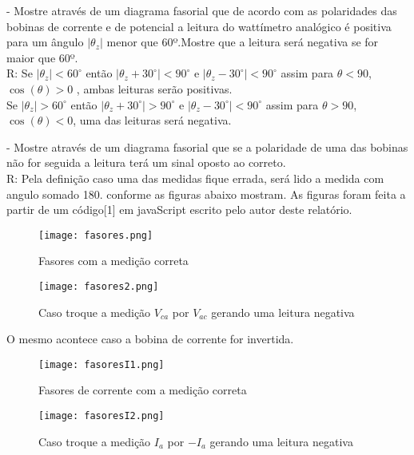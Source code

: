 \documentclass[a4paper, 12pt]{article}
\begin{document}
- Mostre através de um diagrama fasorial que de acordo com as polaridades das bobinas
de corrente e de potencial a leitura do wattímetro analógico é positiva para um ângulo $\left| \theta_z \right|$ menor que 60º.Mostre que a leitura será negativa se  for maior que 60º.\\
R: Se $\left|\theta_z\right| < 60^\circ$ então $\left |\theta_z + 30^\circ\right| < 90^\circ$ e
$\left| \theta_z - 30^\circ \right| < 90^\circ$ assim para $\theta < 90$, $\cos(\theta) > 0$ , ambas leituras serão positivas.\\
Se $\left|\theta_z\right| > 60^\circ$ então $\left |\theta_z + 30^\circ\right| > 90^\circ$ e
$\left| \theta_z - 30^\circ \right| < 90^\circ$ assim para $\theta > 90$, $\cos(\theta) < 0$, uma das leituras será negativa.






- Mostre através de um diagrama fasorial que se a polaridade de uma das bobinas não
for seguida a leitura terá um sinal oposto ao correto.\\
R: Pela definição caso uma  das medidas fique errada, será lido a medida com angulo somado 180. conforme as figuras abaixo mostram. As figuras foram feita a partir de um código[1] em javaScript escrito pelo autor deste relatório.
\begin{figure}[H]
            \centering %
           \texttt{[image: fasores.png]}
            \caption{Fasores com a medição correta}
    \end{figure}
\begin{figure}[H]
            \centering %
           \texttt{[image: fasores2.png]}
            \caption{Caso troque a medição $V_{ca}$ por $V_{ac}$ gerando uma leitura negativa}
    \end{figure}

       O mesmo acontece caso a bobina de corrente for invertida.
       \begin{figure}[H]
            \centering %
           \texttt{[image: fasoresI1.png]}
            \caption{Fasores de corrente com a medição correta}
    \end{figure}
\begin{figure}[H]
            \centering %
           \texttt{[image: fasoresI2.png]}
            \caption{Caso troque a medição $I_{a}$ por $-I_a$ gerando uma leitura negativa}
    \end{figure}
\end{document}
